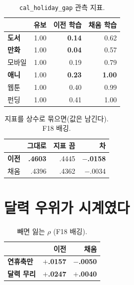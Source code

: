\documentclass[10pt]{article}
\begin{document}
\begin{table}[t]
\centering\tsize
\caption{\texttt{cal\_holiday\_gap} 관측 지표.}
\begin{tabular}{lrrr}
\toprule
& 유보 & 이전 학습 & 채움 학습 \\
\midrule
\textbf{도서} & 1.00 & \textbf{0.14} & 0.62 \\
\textbf{만화} & 1.00 & \textbf{0.04} & 0.57 \\
모바일 & 1.00 & 0.19 & 0.79 \\
\textbf{애니} & 1.00 & \textbf{0.23} & \textbf{1.00} \\
웹툰 & 1.00 & 0.40 & 0.99 \\
펀딩 & 1.00 & 0.41 & 1.00 \\
\bottomrule
\end{tabular}
\end{table}


\begin{table}[t]
\centering\tsize
\caption{지표를 상수로 묶으면(값은 남긴다). F18 배깅.}
\begin{tabular}{lrrr}
\toprule
& 그대로 & 지표 끔 & 차 \\
\midrule
\textbf{이전} & \textbf{.4603} & .4445 & \textbf{$-$.0158} \\
채움 & .4396 & .4362 & $-$.0034 \\
\bottomrule
\end{tabular}
\end{table}


\section{달력 우위가 시계였다}

\begin{table}[t]
\centering\tsize
\caption{빼면 잃는 $\rho$ (F18 배깅).}
\begin{tabular}{lrr}
\toprule
& 이전 & 채움 \\
\midrule
\textbf{연휴축만} & \textbf{$+$.0157} & \textbf{$-$.0050} \\
\textbf{달력 무리} & \textbf{$+$.0247} & \textbf{$+$.0040} \\
\bottomrule
\end{tabular}
\end{table}
\end{document}
